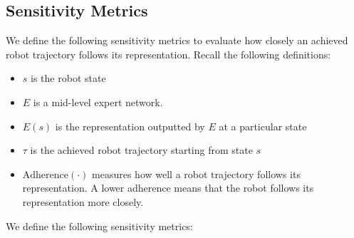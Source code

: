 \documentclass[conference,dvipsnames]{IEEEtran}
\begin{document}
\subsection{Sensitivity Metrics}
\label{appendix:metrics}

We define the following sensitivity metrics to evaluate how closely an achieved robot trajectory follows its representation. Recall the following definitions:
\begin{itemize}
\item $s$ is the robot state
\item $E$ is a mid-level expert network. 
\item $E(s)$ is the representation outputted by $E$ at a particular state
\item $\tau$ is the achieved robot trajectory starting from state $s$
\item $\text{Adherence}(\cdot)$ measures how well a robot trajectory follows its representation. A lower adherence means that the robot follows its representation more closely.
\end{itemize}

We define the following sensitivity metrics:
\end{document}
